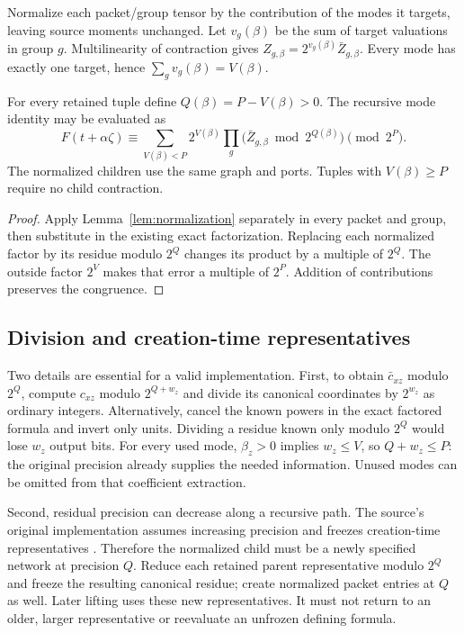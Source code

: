 Normalize each packet/group tensor by the contribution of the modes it
targets, leaving source moments unchanged. Let $v_g(\beta)$ be the sum
of target valuations in group $g$. Multilinearity of contraction gives
$Z_{g,\beta}=2^{v_g(\beta)}\bar Z_{g,\beta}$. Every mode has exactly
one target, hence $\sum_gv_g(\beta)=V(\beta)$.

\begin{theorem}\label{thm:peeling}
For every retained tuple define $Q(\beta)=P-V(\beta)>0$. The recursive
mode identity may be evaluated as
\begin{equation}\label{eq:peeling}
 F(t+\alpha\zeta)\equiv
 \sum_{V(\beta)<P}2^{V(\beta)}
       \prod_g\bigl(\bar Z_{g,\beta}\bmod2^{Q(\beta)}\bigr)
       \pmod {2^P}.
\end{equation}
The normalized children use the same graph and ports. Tuples with
$V(\beta)\ge P$ require no child contraction.
\end{theorem}
\begin{proof}
Apply Lemma~\ref{lem:normalization} separately in every packet and group,
then substitute in the existing exact factorization. Replacing each
normalized factor by its residue modulo $2^Q$ changes its product by a
multiple of $2^Q$. The outside factor $2^V$ makes that error a multiple
of $2^P$. Addition of contributions preserves the congruence.
\end{proof}

\subsection{Division and creation-time representatives}

Two details are essential for a valid implementation. First, to obtain
$\bar c_{xz}$ modulo $2^Q$, compute $c_{xz}$ modulo $2^{Q+w_z}$ and
divide its canonical coordinates by $2^{w_z}$ as ordinary integers.
Alternatively, cancel the known powers in the exact factored formula and
invert only units. Dividing a residue known only modulo $2^Q$ would lose
$w_z$ output bits. For every used mode, $\beta_z>0$ implies $w_z\le V$,
so $Q+w_z\le P$: the original precision already supplies the needed
information. Unused modes can be omitted from that coefficient extraction.

Second, residual precision can decrease along a recursive path. The
source's original implementation assumes increasing precision and freezes
creation-time representatives \cite{upstream}. Therefore the normalized
child must be a newly specified network at precision $Q$. Reduce each
retained parent representative modulo $2^Q$ and freeze the resulting
canonical residue; create normalized packet entries at $Q$ as well.
Later lifting uses these new representatives. It must not return to an
older, larger representative or reevaluate an unfrozen defining formula.

